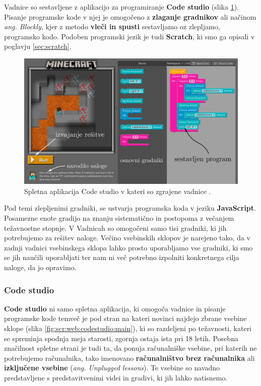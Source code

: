 Vadnice so sestavljene z aplikacijo za programiranje \textbf{Code
  studio} (slika \ref{fig:scr:web:codestudio}). Pisanje programske
kode v njej je omogočeno z \textbf{zlaganje gradnikov} ali načinom
\emph{ang. Blockly}, kjer z metodo \textbf{vleči in spusti}
sestavljamo oz zlepljamo, programsko kodo. Podoben programski jezik je
tudi \textbf{Scratch}, ki smo ga opisali v poglavju
\ref{sec:scratch}.

\begin{figure}[h!]
  \centering
    \includegraphics [width=0.65\linewidth, keepaspectratio =
    1] {./images/sc_web/code_cstudiov01.jpg}
    \caption{Spletna aplikacija Code studio v kateri so zgrajene
      vadnice \cite{web:code.org}.}
    \label{fig:scr:web:codestudio}
\end{figure}

Pod temi zlepljenimi gradniki, se ustvarja programska koda v jeziku
\textbf{JavaScript}. Posamezne enote gradijo na znanju sistematično in
postopoma z večanjem težavnostne stopnje. V Vadnicah so omogočeni samo
tisi gradniki, ki jih potrebujemo za rešitev naloge. Večino vsebinskih
sklopov je narejeno tako, da v zadnji vadnici vsebinskega sklopa lahko
prosto uporabljamo vse gradniki, ki smo se jih naučili uporabljati ter
nam ni več potrebno izpolniti konkretnega cilja naloge, da jo
opravimo.

\subsubsection{Code studio}
\label{sec:code-studio}

\textbf{Code studio} ni samo spletna aplikacija, ki omogoča vadnice in
pisanje programske kode temveč je pod stran na kateri novinci najdejo
zbrane vsebine sklope (slika \ref{fig:scr:web:codestudio:main}), ki so
razdeljeni po težavnosti, kateri se spreminja spodnja meja starosti,
zgornja ostaja ista pri 18 letih. Posebna značilnost spletne strani je
tudi ta, da ponuja računalniške vsebine, pri katerih ne potrebujemo
računalnika, tako imenovano \textbf{računalništvo brez računalnika}
ali \textbf{izključene vsebine} (\emph{ang. Unplugged lessons}). Te
vsebine so navadno predstavljene s predstavitvenimi videi in gradivi,
ki jih lahko natisnemo. 

